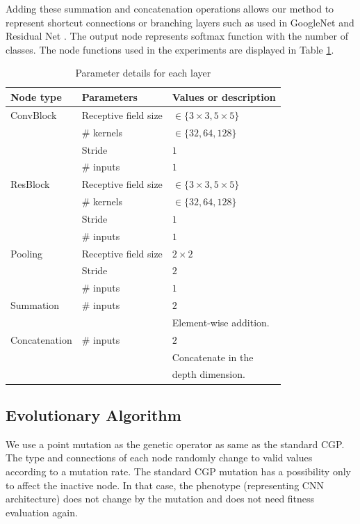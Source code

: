 Adding these summation and concatenation operations allows our method to represent shortcut connections or branching layers such as used in GoogleNet \cite{szegedy_going_2015} and Residual Net \cite{he_deep_2016}.
The output node represents softmax function with the number of classes.
The node functions used in the experiments are displayed in Table \ref{layer_param}.


\begin{table}[tb]
  \caption{Parameter details for each layer}
  \label{layer_param}
  \begin{tabular}{l|l|l} \hline
    Node type & Parameters & Values or description \\ \hline
    ConvBlock & Receptive field size & $\in \{3\times 3, 5\times 5\}$ \\ 
                        & \# kernels & $\in \{32, 64, 128\}$ \\ 
                       & Stride & $1$ \\ 
                       & \# inputs & $1$ \\ \hline
    ResBlock & Receptive field size & $\in \{3\times 3, 5\times 5\}$ \\ 
                        & \# kernels & $\in \{32, 64, 128\}$ \\ 
                       & Stride & $1$ \\ 
                       & \# inputs & $1$ \\ \hline
      Pooling     & Receptive field size & $2\times 2$ \\ 
                       & Stride & $2$ \\ 
                       & \# inputs & $1$ \\ \hline
     Summation & \# inputs & $2$ \\ 
                         &                & Element-wise addition. \\ \hline
 Concatenation & \# inputs & $2$ \\ 
                      &  & Concatenate in the \\
                       &  & depth dimension.\\  \hline
  \end{tabular}
\end{table}


\subsection{Evolutionary Algorithm}
We use a point mutation as the genetic operator as same as the standard CGP. The type and connections of each node randomly change to valid values according to a mutation rate. 
The standard CGP mutation has a possibility only to affect the inactive node. In that case, the phenotype (representing CNN architecture) does not change by the mutation and does not need fitness evaluation again.

